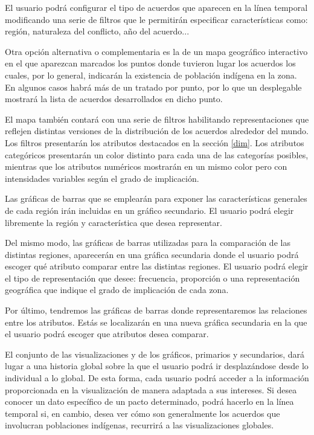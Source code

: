\documentclass[11pt]{article}
\begin{document}
El usuario podrá configurar el tipo de acuerdos que aparecen en la línea temporal modificando una serie de filtros que le permitirán especificar características como: región, naturaleza del conflicto, año del acuerdo...

Otra opción alternativa o complementaria es la de un mapa geográfico interactivo en el que aparezcan marcados los puntos donde tuvieron lugar los acuerdos los cuales, por lo general, indicarán la existencia de población indígena en la zona. En algunos casos habrá más de un tratado por punto, por lo que un desplegable mostrará la lista de acuerdos desarrollados en dicho punto.

El mapa también contará con una serie de filtros habilitando representaciones que reflejen distintas versiones de la distribución de los acuerdos alrededor del mundo. Los filtros presentarán los atributos destacados en la sección \ref{dim}. Los atributos categóricos presentarán un color distinto para cada una de las categorías posibles, mientras que los atributos numéricos mostrarán en un mismo color pero con intensidades variables según el grado de implicación.

Las gráficas de barras que se emplearán para exponer las características generales de cada región irán incluidas en un gráfico secundario. El usuario podrá elegir libremente la región y característica que desea representar. 

Del mismo modo, las gráficas de barras utilizadas para la comparación de las distintas regiones, aparecerán en una gráfica secundaria donde el usuario podrá escoger qué atributo comparar entre las distintas regiones. El usuario podrá elegir el tipo de representación que desee: frecuencia, proporción o una representación geográfica que indique el grado de implicación de cada zona.

Por último, tendremos las gráficas de barras donde representaremos las relaciones entre los atributos. Estás se localizarán en una nueva gráfica secundaria en la que el usuario podrá escoger que atributos desea comparar. 

El conjunto de las visualizaciones y de los gráficos, primarios y secundarios, dará lugar a una historia global sobre la que el usuario podrá ir desplazándose desde lo individual a lo global. De esta forma, cada usuario podrá acceder a la información proporcionada en la visualización de manera adaptada a sus intereses. Si desea conocer un dato específico de un pacto determinado, podrá hacerlo en la línea temporal si, en cambio, desea ver cómo son generalmente los acuerdos que involucran poblaciones indígenas, recurrirá a las visualizaciones globales.
\end{document}
